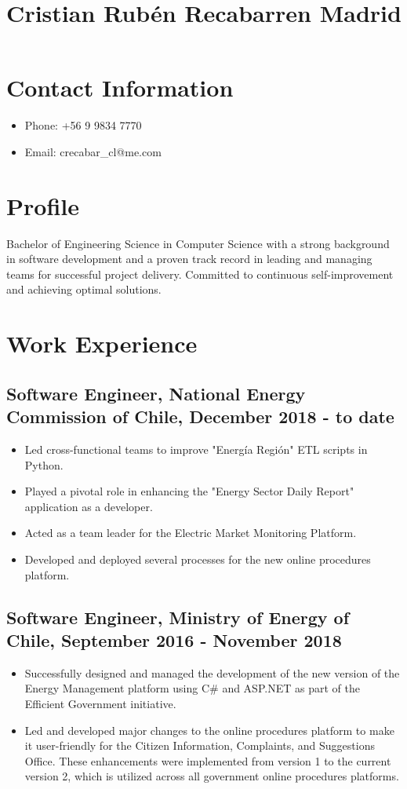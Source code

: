 \documentclass[a4paper,10pt]{article}
\title{Cristian Rubén Recabarren Madrid}
\date{}
\begin{document}
\maketitle

\section*{Contact Information}
\begin{itemize}[leftmargin=*,itemsep=0pt]
  \item Phone: +56 9 9834 7770
  \item Email: crecabar\_cl@me.com
\end{itemize}

\section*{Profile}
Bachelor of Engineering Science in Computer Science with a strong background in software development and a proven track record in leading and managing teams for successful project delivery. Committed to continuous self-improvement and achieving optimal solutions.

\section*{Work Experience}
\subsection*{Software Engineer, National Energy Commission of Chile, December 2018 - to date}
\begin{itemize}[leftmargin=*,itemsep=0pt]
  \item Led cross-functional teams to improve "Energía Región" ETL scripts in Python.
  \item Played a pivotal role in enhancing the "Energy Sector Daily Report" application as a developer.
  \item Acted as a team leader for the Electric Market Monitoring Platform.
  \item Developed and deployed several processes for the new online procedures platform.
\end{itemize}

\subsection*{Software Engineer, Ministry of Energy of Chile, September 2016 - November 2018}
\begin{itemize}[leftmargin=*,itemsep=0pt]
  \item Successfully designed and managed the development of the new version of the Energy Management platform using C# and ASP.NET as part of the Efficient Government initiative.
  \item Led and developed major changes to the online procedures platform to make it user-friendly for the Citizen Information, Complaints, and Suggestions Office. These enhancements were implemented from version 1 to the current version 2, which is utilized across all government online procedures platforms.
\end{itemize}
\end{document}

